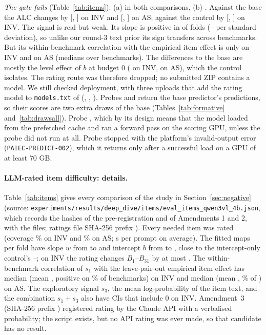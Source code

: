 \documentclass{article}
\begin{document}
\emph{The gate fails} (Table~\ref{tab:items}): (a) \ItGateBaseA{} in both comparisons, (b) \ItGateBaseB. Against the base the ALC changes by \ItInvSOneMean{} [\ItInvSOneLo, \ItInvSOneHi] on INV and \ItAsSOneMean{} [\ItAsSOneLo, \ItAsSOneHi] on AS; against the control by \ItInvCtrlMean{} [\ItInvCtrlLo, \ItInvCtrlHi] on INV. The signal is real but weak. Its slope is positive in \ItNFoldsWPos{} of \ItNFolds{} folds (\ItWMin--\ItWMax{} per standard deviation), so unlike our round-3 text prior its sign transfers across benchmarks. But its within-benchmark correlation with the empirical item effect is only \ItCorrInvMedian{} on INV and \ItCorrAsMedian{} on AS (medians over benchmarks). The differences to the base are mostly the level effect of $b$ at budget 0 (\ItInvSOneDBZero{} on INV, \ItAsSOneDBZero{} on AS), which the control isolates. The rating route was therefore dropped; no submitted ZIP contains a model. We still checked deployment, with three uploads that add the rating model to \texttt{models.txt} of \ProbeBaseIsSel{} (\ProbeAId, \ProbeBId, \ProbeCId). Probes \ProbeAId{} and \ProbeBId{} return the base predictor's predictions, so their scores are two extra draws of the base (Tables~\ref{tab:formative} and~\ref{tab:drawsall}). Probe \ProbeBId{} \ProbeBScored, which by its design means that the model loaded from the prefetched cache and ran a forward pass on the scoring GPU, unless the probe did not run at all. Probe \ProbeCId{} stopped with the platform's invalid-output error (\texttt{PAIEC-PREDICT-002}), which it returns only after a successful load on a GPU of at least 70 GB.

\paragraph{LLM-rated item difficulty: details.} Table~\ref{tab:items} gives every comparison of the study in Section~\ref{sec:negative} (source: \texttt{experiments/results/deep\_dive/items/eval\_items\_qwen3vl\_4b.json}, which records the hashes of the pre-registration and of Amendments 1 and 2, \ItPreregConsistent{} with the files; ratings file SHA-256 prefix \texttt{\ItRatingsSha}). Every needed item was rated (coverage \ItInvCoverage\% on INV and \ItAsCoverage\% on AS; \ItRatingSecPerPrompt{} s per prompt on average). The fitted maps per fold have slope $w$ from \ItWMin{} to \ItWMax{} and intercept $b$ from \ItBMin{} to \ItBMax{}, close to the intercept-only control's \ItBOnlyMin--\ItBOnlyMax; on INV the rating changes $B_1$--$B_{31}$ by at most \ItInvSOneDLaterMax. The within-benchmark correlation of $s_1$ with the leave-pair-out empirical item effect has median \ItCorrInvMedian{} (mean \ItCorrInvMean, positive on \ItCorrInvFracPos\% of \ItCorrInvNBench{} benchmarks) on INV and median \ItCorrAsMedian{} (mean \ItCorrAsMean, \ItCorrAsFracPos\% of \ItCorrAsNBench) on AS. The exploratory signal $s_3$, the mean log-probability of the item text, and the combination $s_1+s_3$ also have CIs that include 0 on INV. Amendment~3 (SHA-256 prefix \texttt{\ItAmThreeSha}) registered rating by the Claude API with a verbalised probability; the script exists, but no API rating was ever made, so that candidate has no result.
\end{document}
